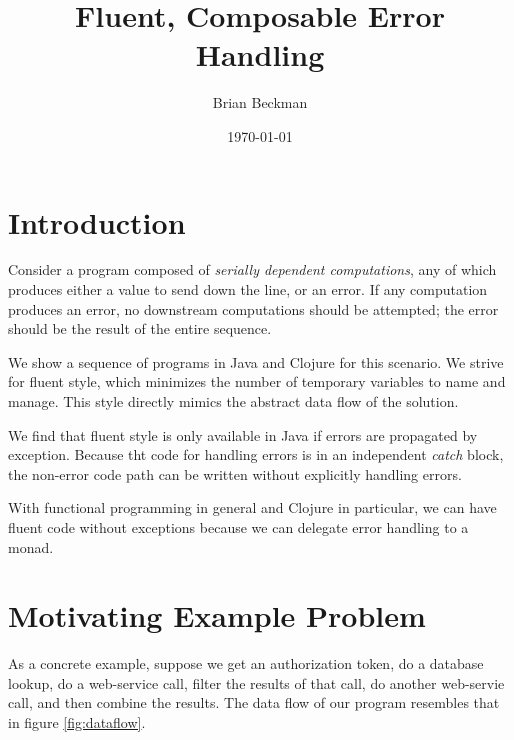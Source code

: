 \documentclass[11pt]{article}
\author{Brian Beckman}
\date{\today}
\title{Fluent, Composable Error Handling}
\begin{document}
\maketitle
\tableofcontents


\section{Introduction}
\label{sec-1}

Consider a program composed of \emph{serially dependent computations},
any of which produces either a value to send down the line, or an
error. If any computation produces an error, no downstream
computations should be attempted; the error should be the result of
the entire sequence.

We show a sequence of programs in Java and Clojure for this
scenario. We strive for fluent style, which minimizes the number of
temporary variables to name and manage. This style directly mimics
the abstract data flow of the solution.

We find that fluent style is only available in Java if errors are
propagated by exception. Because tht code for handling errors is in
an independent \emph{catch} block, the non-error code path can be written
without explicitly handling errors.

With functional programming in general and Clojure in particular, we
can have fluent code without exceptions because we can delegate
error handling to a monad.
\section{Motivating Example Problem}
\label{sec-2}

As a concrete example, suppose we get an authorization token, do a
database lookup, do a web-service call, filter the results of that
call, do another web-servie call, and then combine the results. The
data flow of our program resembles that in figure
\ref{fig:dataflow}.
\end{document}
